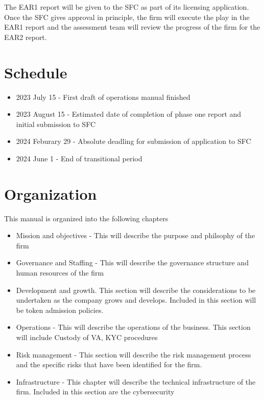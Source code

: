The EAR1 report will be given to the SFC as part of its licensing
application.  Once the SFC gives approval in principle, the firm will
execute the play in the EAR1 report and the assessment team will
review the progress of the firm for the EAR2 report.

\section{Schedule}
\begin{itemize}
\item 2023 July 15 - First draft of operations manual finished
  \item 2023 August 15 - Estimated date of completion of phase one
    report and initial submission to SFC
    \item 2024 Feburary 29 - Absolute deadling for submission of
      application to SFC
    \item 2024 June 1 - End of transitional period
\end{itemize}


\section{Organization}

This manual is organized into the following chapters

\begin{itemize}
\item Mission and objectives - This will describe the purpose and
  philsophy of the firm
  \item Governance and Staffing - This will describe the governance
    structure and human resources of the firm
  \item Development and growth.  This section will describe the
    considerations to be undertaken as the company grows and develops.
    Included in this section will be token admission policies.
  \item Operations - This will describe the operations of the
    business.  This section will include Custody of VA, KYC procedures
  \item Risk management - This section will describe the risk
    management process and the specific risks that have been
    identified for the firm.
  \item Infrastructure - This chapter will describe the technical
    infrastructure of the firm.  Included in this section are the
    cybersecurity
\end{itemize}


